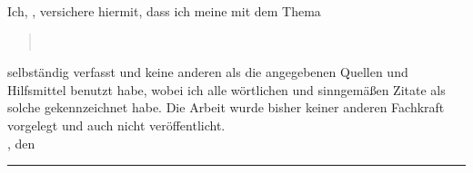 \clearpage
{}


Ich, \autorName, versichere hiermit, dass ich meine \textbf{\betreff} mit dem
Thema
\begin{quote}
\textit{\textbf{\titelOne{} \titelTwo}\\\untertitelOne{} \untertitelTwo}
\end{quote}
selbständig verfasst und keine anderen als die angegebenen Quellen und Hilfsmittel benutzt habe,
wobei ich alle wörtlichen und sinngemäßen Zitate als solche gekennzeichnet habe. Die Arbeit
wurde bisher keiner anderen Fachkraft vorgelegt und auch nicht veröffentlicht.\\[6ex]




\abgabeOrt, den \abgabeTermin


\rule[-0.2cm]{4cm}{0.5pt}

\textsc{\autorName}
